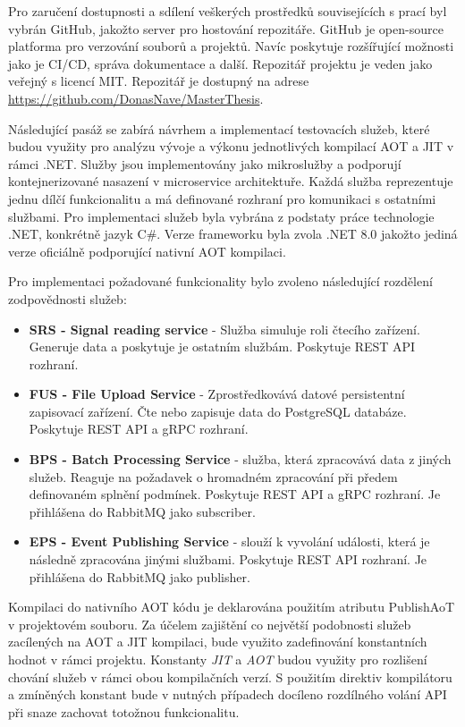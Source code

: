 Pro zaručení dostupnosti a sdílení veškerých prostředků souvisejících s prací byl vybrán GitHub, jakožto server pro hostování repozitáře. GitHub je open-source platforma pro verzování souborů a projektů. Navíc poskytuje rozšířující možnosti jako je CI/CD, správa dokumentace a další. Repozitář projektu je veden jako veřejný s licencí MIT. Repozitář je dostupný na adrese \url{https://github.com/DonasNave/MasterThesis}.


Následující pasáž se zabírá návrhem a implementací testovacích služeb, které budou využity pro analýzu vývoje a výkonu jednotlivých kompilací AOT a JIT v rámci .NET. Služby jsou implementovány jako mikroslužby a podporují kontejnerizované nasazení v microservice architektuře. Každá služba reprezentuje jednu dílčí funkcionalitu a má definované rozhraní pro komunikaci s ostatními službami. Pro implementaci služeb byla vybrána z podstaty práce technologie .NET, konkrétně jazyk C\#. Verze frameworku byla zvola .NET 8.0 jakožto jediná verze oficiálně podporující nativní AOT kompilaci.


Pro implementaci požadované funkcionality bylo zvoleno následující rozdělení zodpovědnosti služeb:

\begin{itemize}
    \item \textbf{SRS - Signal reading service} - Služba simuluje roli čtecího zařízení. Generuje data a poskytuje je ostatním službám. Poskytuje REST API rozhraní.
    \item \textbf{FUS - File Upload Service} - Zprostředkovává datové persistentní zapisovací zařízení. Čte nebo zapisuje data do PostgreSQL databáze. Poskytuje REST API a gRPC rozhraní.
    \item \textbf{BPS - Batch Processing Service} - služba, která zpracovává data z jiných služeb. Reaguje na požadavek o hromadném zpracování při předem definovaném splnění podmínek. Poskytuje REST API a gRPC rozhraní. Je přihlášena do RabbitMQ jako subscriber.
    \item \textbf{EPS - Event Publishing Service} - slouží k vyvolání události, která je následně zpracována jinými službami. Poskytuje REST API rozhraní. Je přihlášena do RabbitMQ jako publisher.
\end{itemize}

Kompilaci do nativního AOT kódu je deklarována použitím atributu PublishAoT v projektovém souboru. Za účelem zajištění co největší podobnosti služeb zacílených na AOT a JIT kompilaci, bude využito zadefinování konstantních hodnot v rámci projektu. Konstanty \emph{JIT} a \emph{AOT} budou využity pro rozlišení chování služeb v rámci obou kompilačních verzí. S použitím direktiv kompilátoru a zmíněných konstant bude v nutných případech docíleno rozdílného volání API při snaze zachovat totožnou funkcionalitu.

